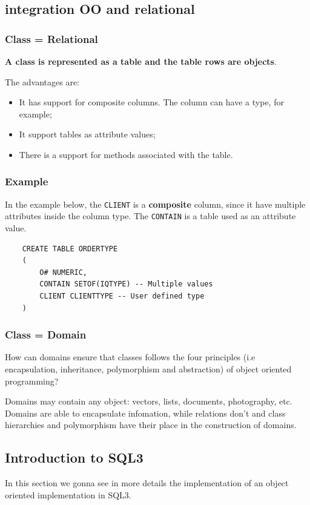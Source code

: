 \subsection{integration OO and relational}
\subsubsection{Class = Relational}
\textbf{A class is represented as a table and the table rows are objects}.

The advantages are:
\begin{itemize}
    \item It has support for composite columns. The column can have a type, for example;
    \item It support tables as attribute values;
    \item There is a support for methods associated with the table.
\end{itemize}

\subsubsection{Example}

    In the example below, the \texttt{CLIENT} is a \textbf{composite} column, since it have multiple attributes inside the column type. The \texttt{CONTAIN} is a table used as an attribute value. 

\begin{lstlisting}
    CREATE TABLE ORDERTYPE
    (
        O# NUMERIC,
        CONTAIN SETOF(IQTYPE) -- Multiple values
        CLIENT CLIENTTYPE -- User defined type
    )
\end{lstlisting}


\subsubsection{Class = Domain}
How can domains ensure that classes follows the four principles (i.e encapsulation, inheritance, polymorphism and abstraction) of object oriented programming?  

Domains may contain any object: vectors, lists, documents, photography, etc. Domains are able to encapsulate infomation, while relations don't and class hierarchies and polymorphism have their place in the construction of domains. 

\newpage 
\subsection{Introduction to SQL3}
In this section we gonna see in more details the implementation of an object oriented implementation in SQL3. 

